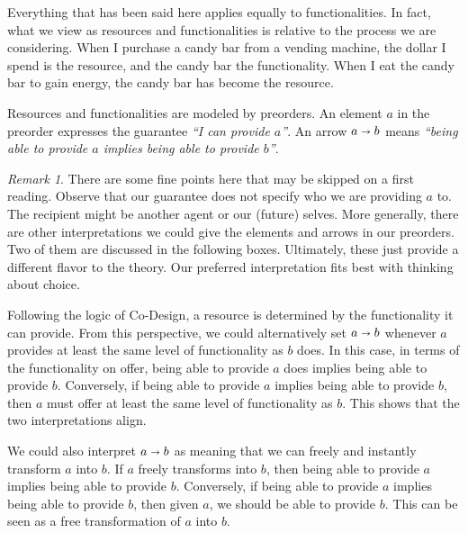 \documentclass[12pt]{article}
\theoremstyle{definition}
\theoremstyle{plain}
\theoremstyle{plain}
\theoremstyle{plain}
\theoremstyle{plain}
\theoremstyle{remark}
\theoremstyle{remark}
\newtheorem{remark}{Remark}[section]
\begin{document}
Everything that has been said here applies equally to functionalities. In fact, what we view as resources and functionalities is relative to the process we are considering. When I purchase a candy bar from a vending machine, the dollar I spend is the resource, and the candy bar the functionality. When I eat the candy bar to gain energy, the candy bar has become the resource.

\begin{tcolorbox}[title=Resources and Functionalities, colframe=Apricot, colback = paleorange, coltitle = Sepia]
	Resources and functionalities are modeled by preorders. An element $a$ in the preorder expresses the guarantee \emph{``I can provide $a$''}. An arrow $a \shortrightarrow b$ means \emph{``being able to provide $a$ implies being able to provide $b$''}. 
\end{tcolorbox}

\begin{remark}
	There are some fine points here that may be skipped on a first reading. Observe that our guarantee does not specify who we are providing $a$ to. The recipient might be another agent or our (future) selves. More generally, there are other interpretations we could give the elements and arrows in our preorders. Two of them are discussed in the following boxes. Ultimately, these just provide a different flavor to the theory. Our preferred interpretation fits best with thinking about choice.
\end{remark}

\begin{tcolorbox}[title= Functionality Interpretation]
	 Following the logic of Co-Design, a resource is determined by the functionality it can provide. From this perspective, we could alternatively set $a \shortrightarrow b$ whenever $a$ provides at least the same level of functionality as $b$ does. In this case, in terms of the functionality on offer, being able to provide $a$ does implies being able to provide $b$. Conversely, if being able to provide $a$ implies being able to provide $b$, then $a$ must offer at least the same level of functionality as $b$. This shows that the two interpretations align.
\end{tcolorbox}

\begin{tcolorbox}[title= Transformation Interpretation]
	We could also interpret $a \shortrightarrow b$ as meaning that we can freely and instantly transform $a$ into $b$. If $a$ freely transforms into $b$, then being able to provide $a$ implies being able to provide $b$. Conversely, if being able to provide $a$ implies being able to provide $b$, then given $a$, we should be able to provide $b$. This can be seen as a free transformation of $a$ into $b$.
\end{tcolorbox}
\end{document}
